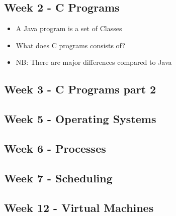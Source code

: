 
\subsection*{Week 2 - C Programs}
\begin{itemize}
\item A Java program is a set of Classes
\item What does C programs consists of?
\item NB: There are major differences compared to Java
\end{itemize}


\subsection*{Week 3 - C Programs part 2}



\subsection*{Week 5 - Operating Systems}



\subsection*{Week 6 - Processes}



\subsection*{Week 7 - Scheduling}



\subsection*{Week 12 - Virtual Machines}

